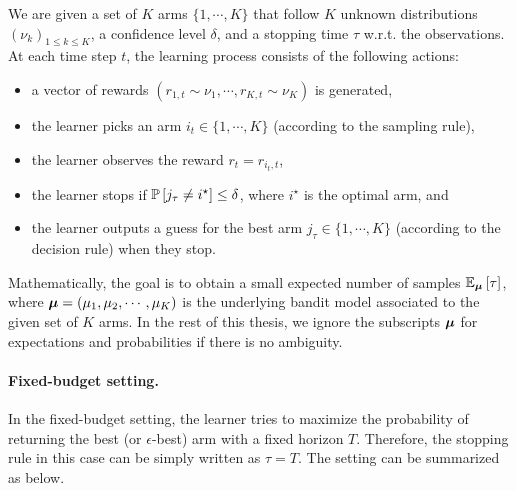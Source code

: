 \begin{definition}\label{def:mab.bai_confidence}
\begin{leftbar}[defnbar]
	We are given a set of $K$ arms $\{1,\cdots,K\}$ that follow $K$ unknown distributions $(\nu_k)_{1 \leq k \leq K}$, a confidence level $\delta$, and a stopping time $\tau$ w.r.t. the observations. At each time step $t$, the learning process consists of the following actions:
\begin{itemize}
	\item a vector of rewards $(r_{1,t} \sim \nu_1, \cdots, r_{K,t} \sim \nu_K)$ is generated,
	\item the learner picks an arm $i_t \in \{1,\cdots,K\}$ (according to the sampling rule),
	\item the learner observes the reward $r_t = r_{i_t, t}$,
	\item the learner stops if $\mathbb{P}\left[j_{\tau}\neq i^{\star}\right] \leq \delta$, where $i^{\star}$ is the optimal arm, and
	\item the learner outputs a guess for the best arm $j_\tau \in \{1,\cdots,K\}$ (according to the decision rule) when they stop.
\end{itemize}
\end{leftbar}
\end{definition}

Mathematically, the goal is to obtain a small expected number of samples $\mathbb{E}_{{\boldsymbol \mu}}\left[\tau\right]$, where ${\boldsymbol \mu}=(\mu_1,\mu_2,\cdots,\mu_K)$ is the underlying bandit model associated to the given set of $K$ arms. In the rest of this thesis, we ignore the subscripts ${\boldsymbol \mu}$ for expectations and probabilities if there is no ambiguity. 

\paragraph{Fixed-budget setting.}

In the fixed-budget setting, the learner tries to maximize the probability of returning the best (or $\epsilon$-best) arm with a fixed horizon $T$. Therefore, the stopping rule in this case can be simply written as $\tau=T$. The setting can be summarized as below.


